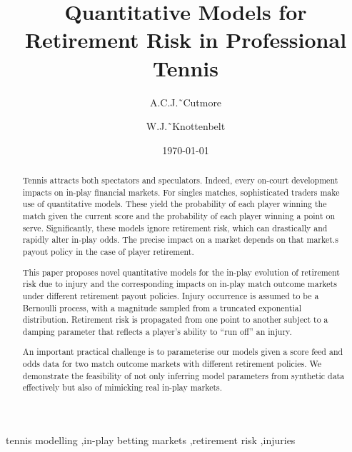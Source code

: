 \documentclass[authoryear, 12pt]{elsarticle}
\begin{document}
\title{Quantitative Models for Retirement Risk in Professional Tennis}

\author[icl]{A.C.J.˜Cutmore}

\author[icl]{W.J.˜Knottenbelt}


\address[icl]{Imperial College London, South Kensington Campus, Exhibition Road,
London, SW7 2AZ, UK}

\date{\today}

\begin{abstract}

Tennis attracts both spectators and speculators.  Indeed, every
on-court development impacts on in-play financial markets.  For
singles matches, sophisticated traders make use of quantitative
models.  These yield the probability of each player winning the match
given the current score and the probability of each player winning a
point on serve.  Significantly, these models ignore retirement risk,
which can drastically and rapidly alter in-play odds. The precise
impact on a market depends on that market.s payout policy in the case
of player retirement.

This paper proposes novel quantitative models for the in-play
evolution of retirement risk due to injury and the corresponding
impacts on in-play match outcome markets under different retirement
payout policies. Injury occurrence is assumed to be a Bernoulli
process, with a magnitude sampled from a truncated exponential
distribution. Retirement risk is propagated from one point to another
subject to a damping parameter that reflects a player's ability to
``run off'' an injury.

An important practical challenge is to parameterise our models given a
score feed and odds data for two match outcome markets with different
retirement policies. We demonstrate the feasibility of not only
inferring model parameters from synthetic data effectively but also of
mimicking real in-play markets.

\end{abstract}

\begin{keyword}
tennis modelling \sep in-play betting markets \sep retirement risk \sep injuries
\end{keyword}

\maketitle
\end{document}
